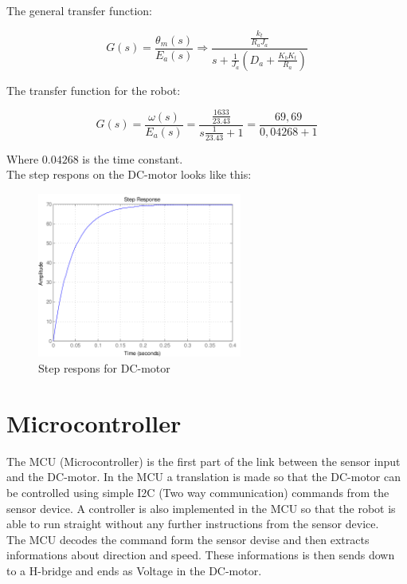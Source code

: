 The general transfer function:

\begin{equation}
G(s)=\frac{\theta_m(s)}{E_a(s)} \Rightarrow \frac{\frac{k_t}{R_a J_a}}{s+\frac{1}{J_a}(D_a + \frac{K_bK_t}{R_a})}
\end{equation}
  
 The transfer function for the robot: 

\begin{equation}
G(s)=\frac{\omega(s)}{E_a(s)}=\frac{\frac{1633}{23.43}}{s\frac{1}{23.43} +1} = \frac{69,69}{0,04268+1}
\end{equation}  

Where $0.04268$ is the time constant. \\
The step respons on the DC-motor looks like this:

\begin{figure}[!h]
	\centering
	\includegraphics[width=0.6\textwidth]{resources/motor_transfer_function.png}
	\caption{Step respons for DC-motor}
	\label{fig:2}
\end{figure}


\section{Microcontroller} 
The MCU (Microcontroller) is the first part of the link between the sensor input and the DC-motor. In the MCU a translation is made so that the DC-motor can be controlled using simple I2C (Two way communication) commands from the sensor device. A controller is also implemented in the MCU so that the robot is able to run straight without any further instructions from the sensor device.\\

The MCU decodes the command form the sensor devise and then extracts informations about direction and speed. These informations is then sends down to a H-bridge and ends as Voltage in the DC-motor.

